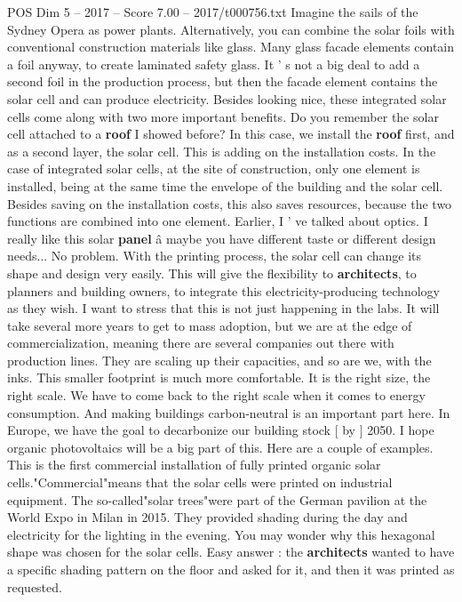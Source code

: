 \begin{textsample}{POS Dim 5 – 2017 – Score 7.00 – 2017/t000756.txt}
Imagine the sails of the Sydney Opera as power plants.
Alternatively, you can combine the solar foils with conventional construction materials like glass.
Many glass facade elements contain a foil anyway, to create laminated safety glass.
It ' s not a big deal to add a second foil in the production process, but then the facade element contains the solar cell and can produce electricity.
Besides looking nice, these integrated solar cells come along with two more important benefits.
Do you remember the solar cell attached to a \textbf{roof} I showed before?
In this case, we install the \textbf{roof} first, and as a second layer, the solar cell.
This is adding on the installation costs.
In the case of integrated solar cells, at the site of construction, only one element is installed, being at the same time the envelope of the building and the solar cell.
Besides saving on the installation costs, this also saves resources, because the two functions are combined into one element.
Earlier, I ' ve talked about optics.
I really like this solar \textbf{panel} â maybe you have different taste or different design needs...
No problem.
With the printing process, the solar cell can change its shape and design very easily.
This will give the flexibility to \textbf{architects}, to planners and building owners, to integrate this electricity-producing technology as they wish.
I want to stress that this is not just happening in the labs.
It will take several more years to get to mass adoption, but we are at the edge of commercialization, meaning there are several companies out there with production lines.
They are scaling up their capacities, and so are we, with the inks.
This smaller footprint is much more comfortable.
It is the right size, the right scale.
We have to come back to the right scale when it comes to energy consumption.
And making buildings carbon-neutral is an important part here.
In Europe, we have the goal to decarbonize our building stock [ by ] 2050.
I hope organic photovoltaics will be a big part of this.
Here are a couple of examples.
This is the first commercial installation of fully printed organic solar cells."Commercial"means that the solar cells were printed on industrial equipment.
The so-called"solar trees"were part of the German pavilion at the World Expo in Milan in 2015.
They provided shading during the day and electricity for the lighting in the evening.
You may wonder why this hexagonal shape was chosen for the solar cells.
Easy answer : the \textbf{architects} wanted to have a specific shading pattern on the floor and asked for it, and then it was printed as requested.

\end{textsample}
